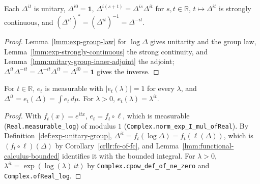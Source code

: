 \begin{lemma}
    \label{lmm:modular-unitary-group-props}
    \leanok
    Each $\Delta^{it}$ is unitary, $\Delta^{i0} = \mathbf{1}$, $\Delta^{i(s+t)} = \Delta^{is}\Delta^{it}$ for $s, t \in \mathbb{R}$, $t \mapsto \Delta^{it}$ is strongly continuous, and $(\Delta^{it})^* = (\Delta^{it})^{-1} = \Delta^{-it}$.
\end{lemma}
\begin{proof}
    \leanok
    Lemma~\ref{lmm:exp-group-law} for $\log\Delta$ gives unitarity and the group law, Lemma~\ref{lmm:exp-strongly-continuous} the strong continuity, and Lemma~\ref{lmm:unitary-group-inner-adjoint} the adjoint; $\Delta^{it}\Delta^{-it} = \Delta^{-it}\Delta^{it} = \Delta^{i0} = \mathbf{1}$ gives the inverse.
\end{proof}

\begin{lemma}
    \label{lmm:modular-unitary-group-fc}
    \leanok
    For $t \in \mathbb{R}$, $e_t$ is measurable with $|e_t(\lambda)| = 1$ for every $\lambda$, and $\Delta^{it} = e_t(\Delta) = \int e_t \, d\mu$. For $\lambda > 0$, $e_t(\lambda) = \lambda^{it}$.
\end{lemma}
\begin{proof}
    \leanok
    With $f_t(x) = e^{itx}$, $e_t = f_t \circ \ell$, which is measurable (\texttt{Real.measurable\_log}) of modulus $1$ (\texttt{Complex.norm\_exp\_I\_mul\_ofReal}). By Definition~\ref{def:exp-unitary-group}, $\Delta^{it} = f_t(\log\Delta) = f_t(\ell(\Delta))$, which is $(f_t \circ \ell)(\Delta)$ by Corollary~\ref{crllr:fc-of-fc}, and Lemma~\ref{lmm:functional-calculus-bounded} identifies it with the bounded integral. For $\lambda > 0$, $\lambda^{it} = \exp(\log(\lambda)\, it)$ by \texttt{Complex.cpow\_def\_of\_ne\_zero} and \texttt{Complex.ofReal\_log}.
\end{proof}

